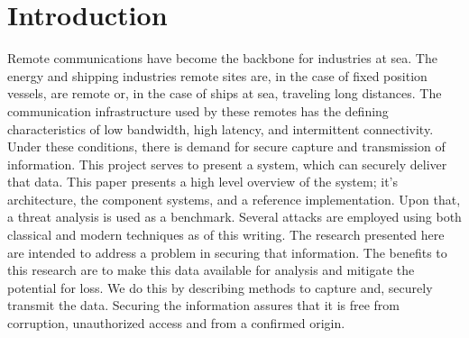 \chapter{Introduction}
Remote communications have become the backbone for industries at sea. The energy and shipping industries remote sites are, in the case of fixed position vessels, are remote or, in the case of ships at sea, traveling long distances. The communication infrastructure used by these remotes has the defining characteristics of low bandwidth, high latency, and intermittent connectivity. Under these conditions, there is demand for secure capture and transmission of information.\cite{Levinson:2010wm} This project serves to present a system, which can securely deliver that data. 
This paper presents a high level overview of the system; it’s architecture, the component systems, and a reference implementation. Upon that, a threat analysis is used as a benchmark. Several attacks are employed using both classical and modern techniques as of this writing.
The research presented here are intended to address a problem in securing that information. The benefits to this research are to make this data available for analysis and mitigate the potential for loss. We do this by describing methods to capture and, securely transmit the data. Securing the information assures that it is free from corruption, unauthorized access and from a confirmed origin.
